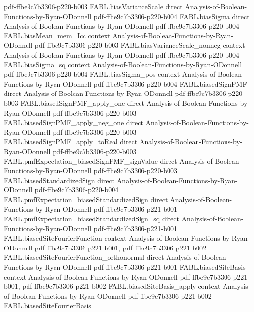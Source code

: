 \begin{theorem}
  {pdf-ffbe9c7b3306-p220-b003}
\proofstep
  {FABL.biasVarianceScale}
  {direct}
  {Analysis-of-Boolean-Functions-by-Ryan-ODonnell}
  {pdf-ffbe9c7b3306-p220-b004}
\proofstep
  {FABL.biasSigma}
  {direct}
  {Analysis-of-Boolean-Functions-by-Ryan-ODonnell}
  {pdf-ffbe9c7b3306-p220-b004}
\proofstep
  {FABL.biasMean_mem_Icc}
  {context}
  {Analysis-of-Boolean-Functions-by-Ryan-ODonnell}
  {pdf-ffbe9c7b3306-p220-b003}
\proofstep
  {FABL.biasVarianceScale_nonneg}
  {context}
  {Analysis-of-Boolean-Functions-by-Ryan-ODonnell}
  {pdf-ffbe9c7b3306-p220-b004}
\proofstep
  {FABL.biasSigma_sq}
  {context}
  {Analysis-of-Boolean-Functions-by-Ryan-ODonnell}
  {pdf-ffbe9c7b3306-p220-b004}
\proofstep
  {FABL.biasSigma_pos}
  {context}
  {Analysis-of-Boolean-Functions-by-Ryan-ODonnell}
  {pdf-ffbe9c7b3306-p220-b004}
\proofstep
  {FABL.biasedSignPMF}
  {direct}
  {Analysis-of-Boolean-Functions-by-Ryan-ODonnell}
  {pdf-ffbe9c7b3306-p220-b003}
\proofstep
  {FABL.biasedSignPMF_apply_one}
  {direct}
  {Analysis-of-Boolean-Functions-by-Ryan-ODonnell}
  {pdf-ffbe9c7b3306-p220-b003}
\proofstep
  {FABL.biasedSignPMF_apply_neg_one}
  {direct}
  {Analysis-of-Boolean-Functions-by-Ryan-ODonnell}
  {pdf-ffbe9c7b3306-p220-b003}
\proofstep
  {FABL.biasedSignPMF_apply_toReal}
  {direct}
  {Analysis-of-Boolean-Functions-by-Ryan-ODonnell}
  {pdf-ffbe9c7b3306-p220-b003}
\proofstep
  {FABL.pmfExpectation_biasedSignPMF_signValue}
  {direct}
  {Analysis-of-Boolean-Functions-by-Ryan-ODonnell}
  {pdf-ffbe9c7b3306-p220-b003}
\proofstep
  {FABL.biasedStandardizedSign}
  {direct}
  {Analysis-of-Boolean-Functions-by-Ryan-ODonnell}
  {pdf-ffbe9c7b3306-p220-b004}
\proofstep
  {FABL.pmfExpectation_biasedStandardizedSign}
  {direct}
  {Analysis-of-Boolean-Functions-by-Ryan-ODonnell}
  {pdf-ffbe9c7b3306-p221-b001}
\proofstep
  {FABL.pmfExpectation_biasedStandardizedSign_sq}
  {direct}
  {Analysis-of-Boolean-Functions-by-Ryan-ODonnell}
  {pdf-ffbe9c7b3306-p221-b001}
\proofstep
  {FABL.biasedSiteFourierFunction}
  {context}
  {Analysis-of-Boolean-Functions-by-Ryan-ODonnell}
  {pdf-ffbe9c7b3306-p221-b001,
    pdf-ffbe9c7b3306-p221-b002}
\proofstep
  {FABL.biasedSiteFourierFunction_orthonormal}
  {direct}
  {Analysis-of-Boolean-Functions-by-Ryan-ODonnell}
  {pdf-ffbe9c7b3306-p221-b001}
\proofstep
  {FABL.biasedSiteBasis}
  {context}
  {Analysis-of-Boolean-Functions-by-Ryan-ODonnell}
  {pdf-ffbe9c7b3306-p221-b001,
    pdf-ffbe9c7b3306-p221-b002}
\proofstep
  {FABL.biasedSiteBasis_apply}
  {context}
  {Analysis-of-Boolean-Functions-by-Ryan-ODonnell}
  {pdf-ffbe9c7b3306-p221-b002}
\proofstep
  {FABL.biasedSiteFourierBasis}

\end{theorem}
